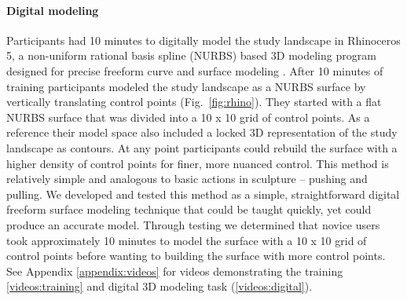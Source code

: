 \documentclass[prodmode,acmtochi]{acmsmall} %
\begin{document}
\paragraph{Digital modeling}
Participants had 10 minutes to digitally model the study landscape in Rhinoceros 5, 
a non-uniform rational basis spline (NURBS) based 3D modeling program
designed for precise freeform curve and surface modeling \cite{Rhino}.
After 10 minutes of training 
participants modeled the study landscape as a NURBS surface 
by vertically translating control points (Fig.~\ref{fig:rhino}). 
They started with a flat NURBS surface that was 
divided into a 10 x 10 grid of control points.
As a reference their model space also included 
a locked 3D representation of the study landscape as contours. 
At any point participants could rebuild the surface 
with a higher density of control points for finer, more nuanced control. 
This method is relatively simple and 
analogous to basic actions in sculpture -- pushing and pulling. 
We developed and tested this method 
as a simple, straightforward digital freeform surface modeling technique
that could be taught quickly, yet could produce an accurate model. 
%  
Through testing we determined that 
novice users took approximately 10 minutes
to model the surface with a 10 x 10 grid of control points
before wanting to building the surface with more control points.
%
See Appendix \ref{appendix:videos}
for videos demonstrating the training \ref{videos:training} and digital 3D modeling task (\ref{videos:digital}).
\end{document}
